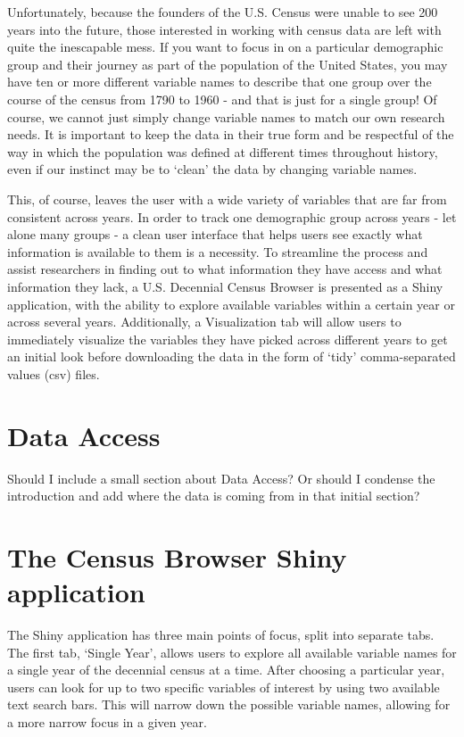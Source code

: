 \documentclass[DIV=calc, paper=a4, fontsize=10pt, twocolumn]{scrartcl}\usepackage[]{graphicx}\usepackage[]{color}
\begin{document}
\par Unfortunately, because the founders of the U.S. Census were unable to see 200 years into the future, those interested in working with census data are left with quite the inescapable mess. If you want to focus in on a particular demographic group and their journey as part of the population of the United States, you may have ten or more different variable names to describe that one group over the course of the census from 1790 to 1960 - and that is just for a single group! Of course, we cannot just simply change variable names to match our own research needs. It is important to keep the data in their true form and be respectful of the way in which the population was defined at different times throughout history, even if our instinct may be to `clean' the data by changing variable names.  

\par This, of course, leaves the user with a wide variety of variables that are far from consistent across years. In order to track one demographic group across years - let alone many groups - a clean user interface that helps users see exactly what information is available to them is a necessity. To streamline the process and assist researchers in finding out to what information they have access and what information they lack, a U.S. Decennial Census Browser is presented as a Shiny application, with the ability to explore available variables within a certain year or across several years. Additionally, a Visualization tab will allow users to immediately visualize the variables they have picked across different years to get an initial look before downloading the data in the form of `tidy' comma-separated values (csv) files. 

\section*{Data Access}

Should I include a small section about Data Access? Or should I condense the introduction and add where the data is coming from in that initial section?  


\section*{The Census Browser Shiny application}  

\par The Shiny application has three main points of focus, split into separate tabs. The first tab, `Single Year', allows users to explore all available variable names for a single year of the decennial census at a time. After choosing a particular year, users can look for up to two specific variables of interest by using two available text search bars. This will narrow down the possible variable names, allowing for a more narrow focus in a given year.  
\end{document}
